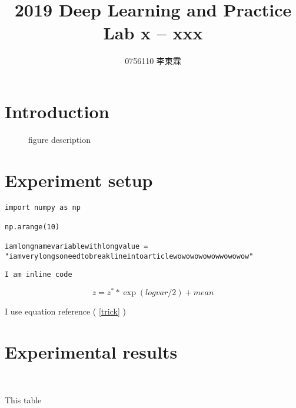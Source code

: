 \documentclass[12pt]{article}
\begin{document}
 
 
\title{2019 Deep Learning and Practice \\ Lab x -- xxx}
\author{0756110 李東霖}

\maketitle
\section{Introduction}

\begin{figure}[H]
\centering
\caption{figure description}
\end{figure}

\section{Experiment setup}

\begin{verbatim}
import numpy as np

np.arange(10)

iamlongnamevariablewithlongvalue = "iamverylongsoneedtobreaklineintoarticlewowowowowowwowowow"
\end{verbatim}

\verb|I am inline code|

\begin{equation}
\label{trick}
z = z^* * \exp(logvar/2) + mean
\end{equation} 

I use equation reference ( \ref{trick} )

\section{Experimental results}


\ \par
This table
\par
{}
\par \ \par
\end{document}
